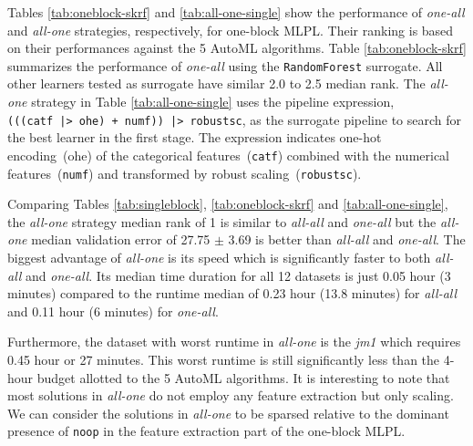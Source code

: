 \documentclass{juliacon}
\begin{document}








\vskip 6pt

Tables \ref{tab:oneblock-skrf} and \ref{tab:all-one-single} show the
performance of \emph{one-all} and \emph{all-one} strategies, 
respectively, for one-block MLPL. Their ranking is based on their performances against the 5 AutoML algorithms.
Table \ref{tab:oneblock-skrf} summarizes the performance of \emph{one-all}
using the \texttt{RandomForest} surrogate.
All other learners tested as surrogate have similar 2.0 to
2.5 median rank. The \emph{all-one} strategy in Table \ref{tab:all-one-single}
uses the pipeline expression,\texttt{(((catf~|>~ohe)~+~numf))~|>~robustsc},
as the surrogate pipeline to
search for the best learner in the first stage.  The expression indicates
one-hot encoding~(ohe) of the categorical features~(\texttt{catf}) combined
with the numerical features~(\texttt{numf}) and transformed by robust scaling~(\texttt{robustsc}).

\vskip 6pt

Comparing Tables \ref{tab:singleblock}, \ref{tab:oneblock-skrf} and \ref{tab:all-one-single}, 
the \emph{all-one} strategy median rank of 1 is
similar to \emph{all-all} and \emph{one-all} but the \emph{all-one}
median validation error of 27.75 $\pm$ 3.69 is better than \emph{all-all} and \emph{one-all}.
The biggest advantage of \emph{all-one}
is its speed which is significantly faster to both \emph{all-all} and \emph{one-all}.
Its median time duration for all 12 datasets is just 0.05
hour (3 minutes) compared to the runtime median of 0.23 hour (13.8 minutes)
for \emph{all-all} and 0.11 hour (6 minutes) for \emph{one-all}. 

\vskip 6pt

Furthermore, the dataset with worst runtime in \emph{all-one} is the
\emph{jm1} which requires 0.45 hour or 27 minutes.  This worst
runtime is still significantly less than the 4-hour budget allotted to the 5
AutoML algorithms. It is interesting to note that most solutions in
\emph{all-one} do not employ any feature extraction but only scaling. We
can consider the solutions in \emph{all-one} to be sparsed relative to
the dominant presence of \texttt{noop} in the feature extraction part
of the one-block MLPL.

\vskip 6pt
\end{document}
